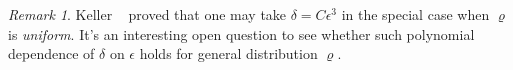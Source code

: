 \documentclass[11pt]{amsart}
\newcommand{\E}{\mathbb{E}}
\newcommand{\PP}{\mathbb{P}}
\newcommand{\eps}{\epsilon}
\newcommand{\1}{\mathbf{1}}
\newcommand{\PL}{\texttt{PLU} }
\def\E{{\mathbb E}}
\theoremstyle{definition}
\theoremstyle{plain}
\theoremstyle{remark}
\newtheorem{remark}[example]{Remark}
\numberwithin{equation}{section}
\begin{document}
\begin{remark}
Keller  ~\cite{Keller10} proved  that one may take $\delta = C \eps^3$
in the special case when $\varrho$ is {\em uniform}. It's an interesting open question to see whether such polynomial dependence of $\delta$ on $\eps$ holds for general distribution $\varrho$.
\end{remark}




%
%
%
%
%
\end{document}

